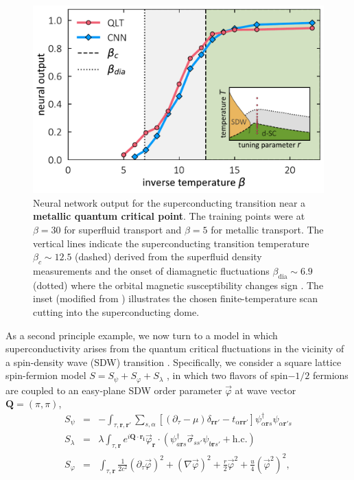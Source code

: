 \documentclass[amsmath,amssymb, aps, prx, longbibliography, twocolumn]{revtex4-1}
\begin{document}
\begin{figure}[b]
\includegraphics[scale=.43]{fig3.pdf}
\caption{Neural network output for the superconducting transition near a {\bf metallic quantum critical point}. The training points were at $\beta=30$ for superfluid transport and $\beta=5$ for metallic transport.
The vertical lines indicate the superconducting transition temperature $\beta_c\sim 12.5$ (dashed) derived from the superfluid density measurements and the onset of diamagnetic fluctuations $\beta_{\textrm{dia}} \sim 6.9$ (dotted) where the orbital magnetic susceptibility changes sign \cite{Schattner2016}. The inset (modified from \cite{Schattner2016}) illustrates the chosen finite-temperature scan cutting into the superconducting dome.} %
\label{fig:afmetal}
\end{figure}
As a second principle example, we now turn to a model in which superconductivity arises from the quantum critical fluctuations in the vicinity of a spin-density wave (SDW) transition \cite{Berg2012,Schattner2016,Gerlach2017,Berg2018}. Specifically, 
we consider a square lattice spin-fermion model $S = S_\psi + S_\varphi + S_\lambda$ \cite{Schattner2016}, in which two flavors of spin$-1/2$ fermions are coupled to an easy-plane SDW order parameter $\vec{\varphi}$ at wave vector $\mathbf{Q}=(\pi, \pi)$, 
\begin{eqnarray}
S_\psi &=&  - \int_{\tau, \mathbf{r}, \mathbf{r'}} \sum_{s, \alpha} \left[ \left(\partial_\tau - \mu\right)\delta_{\mathbf{r}\mathbf{r'}} - t_{\alpha \mathbf{r}\mathbf{r'}} \right] \psi_{\alpha \mathbf{r}s}^\dagger \psi_{\alpha \mathbf{r'}s} \nonumber\\
S_\lambda &=& \lambda \int_{\tau, \mathbf{r}} e^{i \mathbf{Q}\cdot \mathbf{r_i}} \vec{\varphi}_\mathbf{r} \cdot \left( \psi_{a\mathbf{r}s}^\dagger \vec{\sigma}_{ss'}  \psi_{b\mathbf{r}s'} + \textrm{h.c.} \right) \nonumber\\
S_\varphi &=& \int_{\tau,\mathbf{r}} \frac{1}{2c^2} \left(\partial_\tau \vec{\varphi}\right)^2 + \left(\nabla \vec{\varphi} \right)^2 + \frac{r}{2}\vec \varphi^2 + \frac{u}{4} (\vec \varphi^2)^2,
\label{eq:afmetal}
\end{eqnarray}
\end{document}
